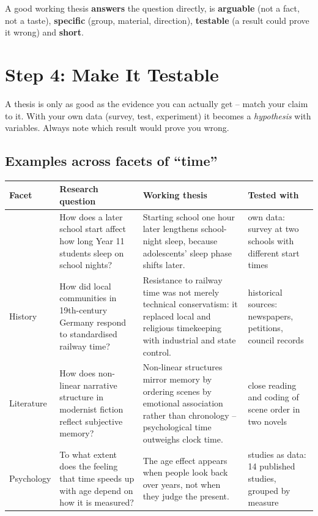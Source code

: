 A good working thesis \textbf{answers} the question directly, is \textbf{arguable} (not a fact, not a taste), \textbf{specific} (group, material, direction), \textbf{testable} (a result could prove it wrong) and \textbf{short}.

\section{Step 4: Make It Testable}

A thesis is only as good as the evidence you can actually get – match your claim to it. With your own data (survey, test, experiment) it becomes a \emph{hypothesis} with variables. Always note which result would prove you wrong.

\subsection{Examples across facets of “time”}
{\small\renewcommand{\arraystretch}{1.12}%
\begin{tabularx}{\linewidth}{@{}>{\raggedright\arraybackslash}p{24mm} >{\raggedright\arraybackslash}X >{\raggedright\arraybackslash}X >{\raggedright\arraybackslash}p{34mm}@{}}
\arrayrulecolor{rule}\toprule
\textbf{Facet} & \textbf{Research question} & \textbf{Working thesis} & \textbf{Tested with}\\\midrule
{\headfont\color{primdark}Chronobiology} & How does a later school start affect how long Year 11 students sleep on school nights? & Starting school one hour later lengthens school-night sleep, because adolescents’ sleep phase shifts later. & own data: survey at two schools with different start times\\\midrule
{\headfont\color{primdark}History} & How did local communities in 19th-century Germany respond to standardised railway time? & Resistance to railway time was not merely technical conservatism: it replaced local and religious timekeeping with industrial and state control. & historical sources: newspapers, petitions, council records\\\midrule
{\headfont\color{primdark}Literature} & How does non-linear narrative structure in modernist fiction reflect subjective memory? & Non-linear structures mirror memory by ordering scenes by emotional association rather than chronology – psychological time outweighs clock time. & close reading and coding of scene order in two novels\\\midrule
{\headfont\color{primdark}Psychology} & To what extent does the feeling that time speeds up with age depend on how it is measured? & The age effect appears when people look back over years, not when they judge the present. & studies as data: 14 published studies, grouped by measure\\\bottomrule
\end{tabularx}}

